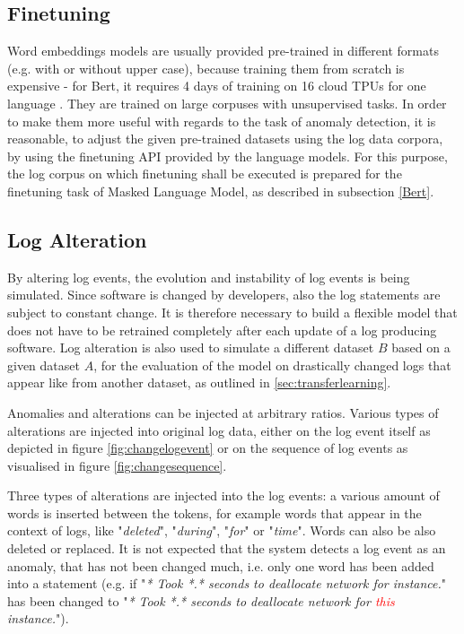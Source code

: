 \subsection{Finetuning\label{sec:finetuning}}
Word embeddings models are usually provided pre-trained in different formats (e.g. with or without upper case), because training them from scratch is expensive - for Bert, it requires 4 days of training on 16 cloud TPUs for one language \cite{googlebert}. They are trained on large corpuses with unsupervised tasks. In order to make them more useful with regards to the task of anomaly detection, it is reasonable, to adjust the given pre-trained datasets using the log data corpora, by using the finetuning API provided by the language models. For this purpose, the log corpus on which finetuning shall be executed is prepared for the finetuning task of Masked Language Model, as described in subsection \ref{Bert}.

\subsection{Log Alteration\label{sec:logs_alteration}}
By altering log events, the evolution and instability of log events is being simulated. Since software is changed by developers, also the log statements are subject to constant change. It is therefore necessary to build a flexible model that does not have to be retrained completely after each update of a log producing software. Log alteration is also used to simulate a different dataset $B$ based on a given dataset $A$, for the evaluation of the model on drastically changed logs that appear like from another dataset, as outlined in \ref{sec:transferlearning}.

Anomalies and alterations can be injected at arbitrary ratios. Various types of alterations are injected into original log data, either on the log event itself as depicted in figure \ref{fig:changelogevent} or on the sequence of log events as visualised in figure \ref{fig:changesequence}.

Three types of alterations are injected into the log events: a various amount of words is inserted between the tokens, for example words that appear in the context of logs, like "\textit{deleted}", "\textit{during}", "\textit{for}" or "\textit{time}". Words can also be also deleted or replaced. It is not expected that the system detects a log event as an anomaly, that has not been changed much, i.e. only one word has been added into a statement (e.g. if "\textit{* Took *.* seconds to deallocate network for instance.}" has been changed to "\textit{* Took *.* seconds to deallocate network for \textcolor{red}{this} instance.}").

